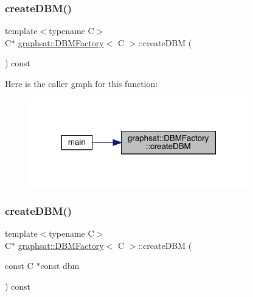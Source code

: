 \subsubsection{\texorpdfstring{createDBM()}{createDBM()}\hspace{0.1cm}{\footnotesize\ttfamily [1/2]}}
{\footnotesize\ttfamily template$<$typename C$>$ \\
C$\ast$ \mbox{\hyperlink{classgraphsat_1_1_d_b_m_factory}{graphsat\+::\+D\+B\+M\+Factory}}$<$ C $>$\+::create\+D\+BM (\begin{DoxyParamCaption}{ }\end{DoxyParamCaption}) const\hspace{0.3cm}{\ttfamily [inline]}}

Here is the caller graph for this function\+:
\nopagebreak
\begin{figure}[H]
\begin{center}
\leavevmode
\includegraphics[width=270pt]{classgraphsat_1_1_d_b_m_factory_ac51eaa5ba3e4049b0de4ac8fe5950ca1_icgraph}
\end{center}
\end{figure}
\mbox{\label{classgraphsat_1_1_d_b_m_factory_a861184abac08ce37064083f653ab99cc}} 
\subsubsection{\texorpdfstring{createDBM()}{createDBM()}\hspace{0.1cm}{\footnotesize\ttfamily [2/2]}}
{\footnotesize\ttfamily template$<$typename C$>$ \\
C$\ast$ \mbox{\hyperlink{classgraphsat_1_1_d_b_m_factory}{graphsat\+::\+D\+B\+M\+Factory}}$<$ C $>$\+::create\+D\+BM (\begin{DoxyParamCaption}\item[{const C $\ast$const}]{dbm }\end{DoxyParamCaption}) const\hspace{0.3cm}{\ttfamily [inline]}}

